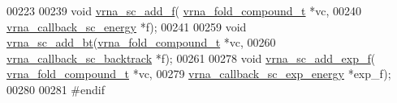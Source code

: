 \begin{DoxyCode}
00223 
00239 \textcolor{keywordtype}{void} \hyperlink{group__soft__constraints_ga8c7d907ec0125cd61c04e0908010a4e9}{vrna\_sc\_add\_f}( \hyperlink{group__fold__compound_structvrna__fc__s}{vrna\_fold\_compound\_t} *vc,
00240                     \hyperlink{group__soft__constraints_gaf38062858ac25fd5e240c2c3b0b0b780}{vrna\_callback\_sc\_energy} *f);
00241 
00259 \textcolor{keywordtype}{void} \hyperlink{group__soft__constraints_gabde7d07a79bb9a8f4721aee247b674ea}{vrna\_sc\_add\_bt}(\hyperlink{group__fold__compound_structvrna__fc__s}{vrna\_fold\_compound\_t} *vc,
00260                     \hyperlink{group__soft__constraints_gaa216f513c3b0bd6fe5807dd0c53a8e5a}{vrna\_callback\_sc\_backtrack} *f);
00261 
00278 \textcolor{keywordtype}{void} \hyperlink{group__soft__constraints_ga87e382b5d0c9b7d9ce1b79c0473ff700}{vrna\_sc\_add\_exp\_f}( \hyperlink{group__fold__compound_structvrna__fc__s}{vrna\_fold\_compound\_t} *vc,
00279                         \hyperlink{group__soft__constraints_ga2eade8745c163a553763be4cfe2a679b}{vrna\_callback\_sc\_exp\_energy} *exp\_f);
00280 
00281 \textcolor{preprocessor}{#endif}
\end{DoxyCode}
